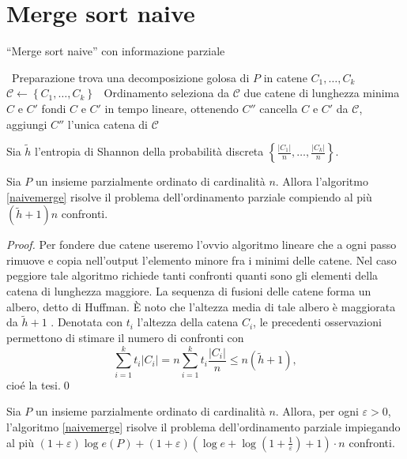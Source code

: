 \section{Merge sort naive} 
\begin{algorithm}
	\caption{``Merge sort naive'' con informazione parziale} \label{naivemerge} 
	\begin{algorithmic}
		[1] \STATE \, \COMMENT Preparazione \STATE trova una decomposizione golosa di \(P\) in catene \(C_1,\dots,C_k\) \STATE \(\mathcal{C}\leftarrow\left\{C_1,\dots,C_k\right\}\) \STATE \, \COMMENT Ordinamento  \STATE seleziona da \(\mathcal{C}\) due catene di lunghezza minima \(C\) e \(C'\) \STATE fondi \(C\) e \(C'\) in tempo lineare, ottenendo \(C''\) \STATE cancella \(C\) e \(C'\) da \(\mathcal{C}\), aggiungi \(C''\) \ENDWHILE \RETURN l'unica catena di \(\mathcal{C}\) 
	\end{algorithmic}
\end{algorithm}
Sia \(\tilde{h}\) l'entropia di Shannon della probabilità discreta \(\left\{\frac{|C_1|}{n},\dots,\frac{|C_k|}{n}\right\}\). 
\begin{lemma}
	\label{naivemergelemma} Sia \(P\) un insieme parzialmente ordinato di cardinalità \(n\). Allora l'algoritmo \ref{naivemerge} risolve il problema dell'ordinamento parziale compiendo al più \((\tilde{h}+1)n\) confronti. 
\end{lemma}
\begin{proof}
	Per fondere due catene useremo l'ovvio algoritmo lineare che a ogni passo rimuove e copia nell'output l'elemento minore fra i minimi delle catene. Nel caso peggiore tale algoritmo richiede tanti confronti quanti sono gli elementi della catena di lunghezza maggiore. La sequenza di fusioni delle catene forma un albero, detto di Huffman. È noto che l'altezza media di tale albero è maggiorata da \(\tilde{h}+1\) \cite{Cover2006}. Denotata con \(t_i\) l'altezza della catena \(C_i\), le precedenti osservazioni permettono di stimare il numero di confronti con
	\[\sum_{i=1}^{k}{t_i|C_i|}=n\sum_{i=1}^{k}{t_i\frac{|C_i|}{n}}\le n(\tilde{h}+1),\]
	cioé la tesi.\qed 
\end{proof}
\begin{theorem}
	\label{naivemergetheorem} Sia \(P\) un insieme parzialmente ordinato di cardinalità \(n\). Allora, per ogni \(\varepsilon>0\), l'algoritmo \ref{naivemerge} risolve il problema dell'ordinamento parziale impiegando al più \((1+\varepsilon)\log{e(P)}+(1+\varepsilon)\left(\log{e}+\log{\left(1+\frac{1}{\varepsilon}\right)}+1\right)\cdot n\) confronti. 
\end{theorem}
